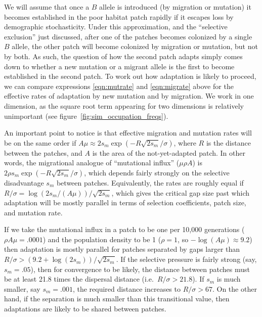 \documentclass{article}
\begin{document}
We will assume that once a $B$ allele is introduced (by migration or mutation) 
it becomes established in the poor habitat patch rapidly
if it escapes loss by demographic stochasticity.
Under this approximation, and the ``selective exclusion'' just discussed,
after one of the patches becomes colonized by a single $B$ allele, 
the other patch will become colonized by migration or mutation, but not by both. 
As such, the question of how the second patch adapts
simply comes down to whether a new mutation or a migrant allele is the first to become established in the second patch. 
To work out how adaptation is likely to proceed, 
we can compare expressions \eqref{eqn:mutrate} and \eqref{eqn:migrate} above
for the effective rates of adaptation by new mutation and by migration.
We work in one dimension, as the square root term appearing for two dimensions is relatively unimportant (see figure~\ref{fig:sim_occupation_freqs}).

An important point to notice is that effective migration and mutation rates will be on the same order if 
$A \mu \approx 2 s_m \exp(- R \sqrt{2 s_m} / \sigma)$,
where $R$ is the distance between the patches,
and $A$ is the area of the not-yet-adapted patch.
In other words, the migrational analogue of ``mutational influx'' ($\mu \rho A$) 
is $2 \rho s_m \exp(- R \sqrt{2 s_m} / \sigma)$,
which depends fairly strongly on the selective disadvantage $s_m$ between patches.
Equivalently, the rates are roughly equal if
$R/\sigma = \log(2 s_m/(A \mu))/\sqrt{2s_m}$,
which gives the critical gap size past which adaptation will be mostly parallel
in terms of selection coefficients, patch size, and mutation rate.


If we take the mutational influx in a patch to be one per 10,000 generations ($\rho A \mu = .0001$)
and the population density to be 1 ($\rho =1$, so $-\log(A\mu)\approx 9.2$)
then adaptation is mostly parallel for patches separated by gaps larger than $R/\sigma > (9.2+\log(2s_m))/\sqrt{2s_m}$.
If the selective pressure is fairly strong (say, $s_m=.05$),
then for convergence to be likely,
the distance between patches must be at least 21.8 times the dispersal distance (i.e.\ $R/\sigma > 21.8$).
If $s_m$ is much smaller, say $s_m = .001$, 
the required distance increases to $R/\sigma > 67$.
On the other hand, if the separation is much smaller than this transitional value, 
then adaptations are likely to be shared between patches.
\end{document}
